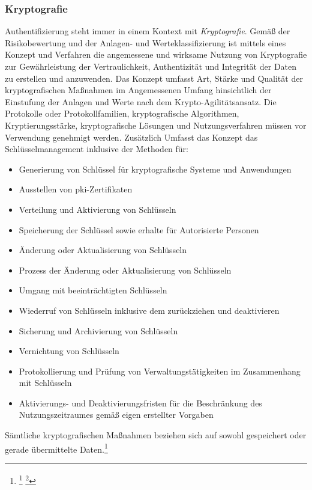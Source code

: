 \documentclass[11pt,a4paper,hidelinks]{article}   %
\begin{document}
            \subsubsection{Kryptografie}
            Authentifizierung steht immer in einem Kontext mit \emph{Kryptografie}. Gemäß der Risikobewertung und der Anlagen- und Werteklassifizierung ist mittels eines Konzept und Verfahren die angemessene und wirksame Nutzung von Kryptografie zur Gewährleistung der Vertraulichkeit, Authentizität und Integrität der Daten zu erstellen und anzuwenden. Das Konzept umfasst Art, Stärke und Qualität der kryptografischen Maßnahmen im Angemessenen Umfang hinsichtlich der Einstufung der Anlagen und Werte nach dem Krypto-Agilitätsansatz. Die Protokolle oder Protokollfamilien, kryptografische Algorithmen, Kryptierungsstärke, kryptografische Lösungen und Nutzungsverfahren müssen vor Verwendung genehmigt werden. Zusätzlich Umfasst das Konzept das Schlüsselmanagement inklusive der Methoden für:
            \begin{itemize}
                \item Generierung von Schlüssel für kryptografische Systeme und Anwendungen
                \item Ausstellen von \gls{pki}-Zertifikaten
                \item Verteilung und Aktivierung von Schlüsseln
                \item Speicherung der Schlüssel sowie erhalte für Autorisierte Personen
                \item Änderung oder Aktualisierung von Schlüsseln
                \item Prozess der Änderung oder Aktualisierung von Schlüsseln
                \item Umgang mit beeinträchtigten Schlüsseln
                \item Wiederruf von Schlüsseln inklusive dem zurückziehen und deaktivieren
                \item Sicherung und Archivierung von Schlüsseln
                \item Vernichtung von Schlüsseln
                \item Protokollierung und Prüfung von Verwaltungstätigkeiten im Zusammenhang mit Schlüsseln
                \item Aktivierungs- und Deaktivierungsfristen für die Beschränkung des Nutzungszeitraumes gemäß eigen erstellter Vorgaben
            \end{itemize}Sämtliche kryptografischen Maßnahmen beziehen sich auf sowohl gespeichert oder gerade übermittelte Daten.\footnote{
                \footcite[Vgl. Nummer 9,][, Anhang]{EU2024-2690}
                \footcite[Vgl. §30 Absatz 2, Nummer 8,][]{NIS2UmsuCG} %
            }
            
\end{document}
